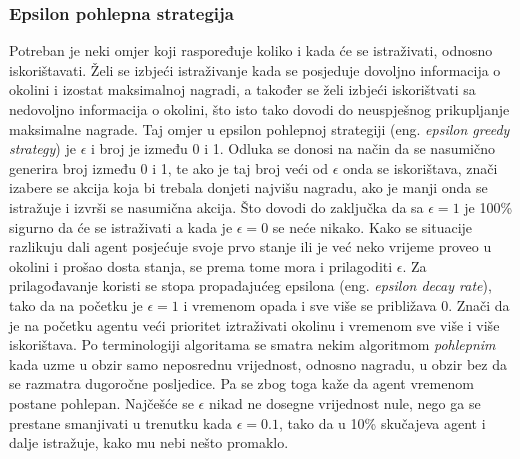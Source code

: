 \subsubsection{Epsilon pohlepna strategija}
Potreban je neki omjer koji raspoređuje koliko i kada će se istraživati, odnosno iskorištavati. Želi se izbjeći istraživanje kada se posjeduje dovoljno informacija o okolini i izostat maksimalnoj nagradi, a također se želi izbjeći iskorištvati sa nedovoljno informacija o okolini, što isto tako dovodi do neuspješnog prikupljanje maksimalne nagrade. Taj omjer u epsilon pohlepnoj strategiji (eng. \textit{epsilon greedy strategy}) je $\epsilon$ i broj je između 0 i 1. Odluka se donosi na način da se nasumično generira broj između 0 i 1, te ako je taj broj veći od $\epsilon$ onda se iskorištava, znači izabere se akcija koja bi trebala donjeti najvišu nagradu, ako je manji onda se istražuje i izvrši se nasumična akcija. Što dovodi do zaključka da sa $\epsilon = 1$ je 100\% sigurno da će se istraživati a kada je $\epsilon = 0$ se neće nikako. Kako se situacije razlikuju dali agent posjećuje svoje prvo stanje ili je već neko vrijeme proveo u okolini i prošao dosta stanja, se prema tome mora i prilagoditi $\epsilon$. Za prilagođavanje koristi se stopa propadajućeg epsilona (eng. \textit{epsilon decay rate}), tako da na početku je $\epsilon = 1$ i vremenom opada i sve više se približava 0. Znači da je na početku agentu veći prioritet iztraživati okolinu i vremenom sve više i više iskorištava. Po terminologiji algoritama se smatra nekim algoritmom \emph{pohlepnim} kada uzme u obzir samo neposrednu vrijednost, odnosno nagradu, u obzir bez da se razmatra dugoročne posljedice. Pa se zbog toga kaže da agent vremenom postane pohlepan. Najčešće se $\epsilon$ nikad ne dosegne vrijednost nule, nego ga se prestane smanjivati u trenutku kada $\epsilon = 0.1$, tako da u 10\% skučajeva agent i dalje istražuje, kako mu nebi nešto promaklo.

